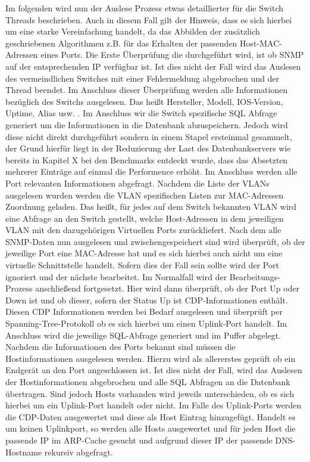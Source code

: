 Im folgenden wird nun der Auslese Prozess etwas detaillierter für die Switch Threads beschrieben. Auch in diesem Fall gilt der Hinweis, dass es sich hierbei um eine starke Vereinfachung handelt, da das Abbilden der zusätzlich geschriebenen Algorithmen z.B. für das Erhalten der passenden Host-MAC-Adressen eines Ports. 
Die Erste Überprüfung die durchgeführt wird, ist ob SNMP auf der entsprechenden IP verfügbar ist. Ist dies nicht der Fall wird das Auslesen des vermeindlichen Switches mit einer Fehlermeldung abgebrochen und der Thread beendet. Im Anschluss dieser Überprüfung werden alle Informationen bezüglich des Switchs ausgelesen. Das heißt Hersteller, Modell, IOS-Version, Uptime, Alias usw. . Im Anschluss wir die Switch spezifische SQL Abfrage generiert um die Informationen in die Datenbank abzuspeichern. Jedoch wird diese nicht direkt durchgeführt sondern in einem Stapel ersteinmal gesammelt, der Grund hierfür liegt in der Reduzierung der Last des Datenbankservers wie bereits in Kapitel X bei den Benchmarks entdeckt wurde, dass das Absetzten mehrerer Einträge auf einmal die Performence erhöht.
Im Anschluss werden alle Port relevanten Informationen abgefragt. 
Nachdem die Liste der VLANs ausgelesen wurden werden die VLAN spezifischen Listen zur MAC-Adressen Zuordnung geladen. Das heißt, für jedes auf dem Switch bekannten VLAN wird eine Abfrage an den Switch gestellt, welche Host-Adressen in dem jeweiligen VLAN mit den dazugehörigen Virtuellen Ports zurückliefert.
Nach dem alle SNMP-Daten nun ausgelesen und zwischengespeichert sind wird überprüft, ob der jeweilige Port eine MAC-Adresse hat und es sich hierbei auch nicht um eine virtuelle Schnittstelle handelt. Sofern dies der Fall sein sollte wird der Port ignoriert und der nächste bearbeitet. Im Normalfall wird der Bearbeitungs-Prozess anschließend fortgesetzt. Hier wird dann überprüft, ob der Port Up oder Down ist und ob dieser, sofern der Status Up ist CDP-Informationen enthält. Diesen CDP Informationen werden bei Bedarf ausgelesen und überprüft per Spanning-Tree-Protokoll ob es sich hierbei um einen Uplink-Port handelt. Im Anschluss wird die jeweilige SQL-Abfrage generiert und im Puffer abgelegt.
Nachdem die Informationen des Ports bekannt sind müssen die Hostinformationen ausgelesen werden. Hierzu wird als allererstes geprüft ob ein Endgerät an den Port angeschlossen ist. Ist dies nicht der Fall, wird das Auslesen der Hostinformationen abgebrochen und alle SQL Abfragen an die Datenbank übertragen. Sind jedoch Hosts vorhanden wird jeweils unterschieden, ob es sich hierbei um ein Uplink-Port handelt oder nicht. Im Falle des Uplink-Ports werden die CDP-Daten ausgewertet und diese als Host Eintrag hinzugefügt. Handelt es um keinen Uplinkport, so werden alle Hosts ausgewertet und für jeden Host die passende IP im ARP-Cache gesucht und aufgrund dieser IP der passende DNS-Hostname rekursiv abgefragt.
